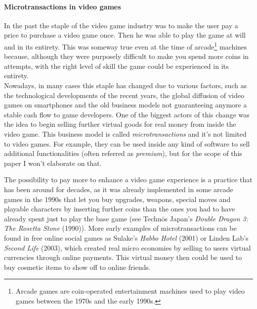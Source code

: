 \documentclass[10pt,a4paper]{article}
\begin{document}
\paragraph{Microtransactions in video games}
In the past the staple of the video game industry was to make the user pay a price to purchase a video game once.
Then he was able to play the game at will and in its entirety.
This was someway true even at the time of arcade\footnote{Arcade games are coin-operated entertainment machines used to play video games between the 1970s and the early 1990s.} machines because, although they were purposely difficult to make you spend more coins in attempts, with the right level of skill the game could be experienced in its entirety.\\
Nowadays, in many cases this staple has changed due to various factors, such as the technological developments of the recent years, the global diffusion of video games on smartphones and the old business models not guaranteeing anymore a stable cash flow to game developers. 
One of the biggest actors of this change was the idea to begin selling further virtual goods for real money from inside the video game. This business model is called \textit{microtransactions} and it's not limited to video games. 
For example, they can be used inside any kind of software to sell additional functionalities (often referred as \textit{premium}), but for the scope of this paper I won't elaborate on that.

The possibility to pay more to enhance a video game experience is a practice that has been around for decades, as it was already implemented in some arcade games in the 1990s that let you buy upgrades, weapons, special moves and playable characters by inserting further coins than the ones you had to have already spent just to play the base game (see Technōs Japan's \textit{Double Dragon 3: The Rosetta Stone} (1990)).
More early examples of microtransactions can be found in free online social games as Sulake's \textit{Habbo Hotel} (2001) or Linden Lab's \textit{Second Life} (2003), which created real micro economies by selling to users virtual currencies through online payments.
This virtual money then could be used to buy cosmetic items to show off to online friends.
\end{document}

